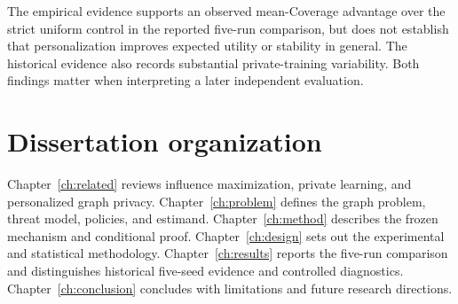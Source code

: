 The empirical evidence supports an observed mean-Coverage advantage over the strict uniform control in the reported five-run comparison, but does not establish that personalization improves expected utility or stability in general. The historical evidence also records substantial private-training variability. Both findings matter when interpreting a later independent evaluation.

\section{Dissertation organization}
Chapter~\ref{ch:related} reviews influence maximization, private learning, and personalized graph privacy. Chapter~\ref{ch:problem} defines the graph problem, threat model, policies, and estimand. Chapter~\ref{ch:method} describes the frozen mechanism and conditional proof. Chapter~\ref{ch:design} sets out the experimental and statistical methodology. Chapter~\ref{ch:results} reports the five-run comparison and distinguishes historical five-seed evidence and controlled diagnostics. Chapter~\ref{ch:conclusion} concludes with limitations and future research directions.
